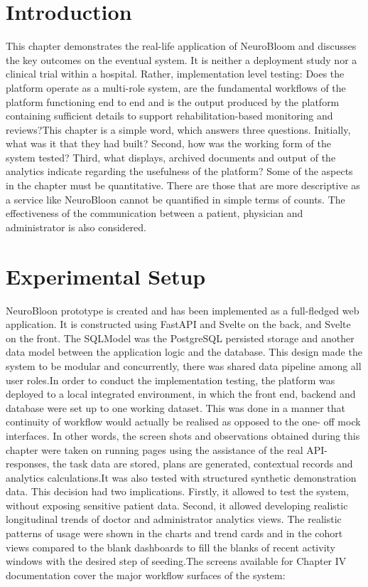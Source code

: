 \documentclass[12pt,a4paper]{report}
\begin{document}
\section{Introduction}
This chapter demonstrates the real-life application of NeuroBloom and discusses the key outcomes on the eventual system. It is neither a deployment study nor a clinical trial within a hospital. Rather, implementation level testing: Does the platform operate as a multi-role system, are the fundamental workflows of the platform functioning end to end and is the output produced by the platform containing sufficient details to support rehabilitation-based monitoring and reviews?This chapter is a simple word, which answers three questions. Initially, what was it that they had built? Second, how was the working form of the system tested? Third, what displays, archived documents and output of the analytics indicate regarding the usefulness of the platform? Some of the aspects in the chapter must be quantitative. There are those that are more descriptive as a service like NeuroBloon cannot be quantified in simple terms of counts. The effectiveness of the communication between a patient, physician and administrator is also considered.

\section{Experimental Setup}
NeuroBloon prototype is created and has been implemented as a full-fledged web application. It is constructed using FastAPI and Svelte on the back, and Svelte on the front. The SQLModel was the PostgreSQL persisted storage and another data model between the application logic and the database. This design made the system to be modular and concurrently, there was shared data pipeline among all user roles.In order to conduct the implementation testing, the platform was deployed to a local integrated environment, in which the front end, backend and database were set up to one working dataset. This was done in a manner that continuity of workflow would actually be realised as opposed to the one- off mock interfaces. In other words, the screen shots and observations obtained during this chapter were taken on running pages using the assistance of the real API-responses, the task data are stored, plans are generated, contextual records and analytics calculations.It was also tested with structured synthetic demonstration data. This decision had two implications. Firstly, it allowed to test the system, without exposing sensitive patient data. Second, it allowed developing realistic longitudinal trends of doctor and administrator analytics views. The realistic patterns of usage were shown in the charts and trend cards and in the cohort views compared to the blank dashboards to fill the blanks of recent activity windows with the desired step of seeding.The screens available for Chapter IV documentation cover the major workflow surfaces of the system:
\end{document}
